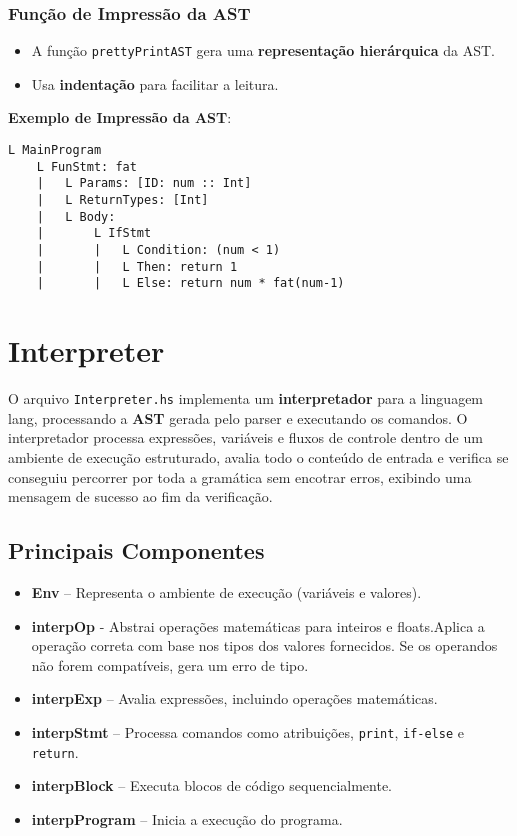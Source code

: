 \documentclass{article}
\begin{document}
\subsubsection{Função de Impressão da AST}
\begin{itemize}
    \item A função \texttt{prettyPrintAST} gera uma \textbf{representação hierárquica} da AST.
    \item Usa \textbf{indentação} para facilitar a leitura.
\end{itemize}

\textbf{Exemplo de Impressão da AST}:
\begin{verbatim}
L MainProgram
    L FunStmt: fat
    |   L Params: [ID: num :: Int]
    |   L ReturnTypes: [Int]
    |   L Body:
    |       L IfStmt
    |       |   L Condition: (num < 1)
    |       |   L Then: return 1
    |       |   L Else: return num * fat(num-1)
\end{verbatim}


\section{Interpreter}

O arquivo \texttt{Interpreter.hs} implementa um \textbf{interpretador} para a linguagem lang, processando a \textbf{AST} gerada pelo parser e executando os comandos. O interpretador processa expressões, variáveis e fluxos de controle dentro de um ambiente de execução estruturado, avalia todo o conteúdo de entrada e verifica se conseguiu percorrer por toda a gramática sem encotrar erros, exibindo uma mensagem de sucesso ao fim da verificação.

\subsection{Principais Componentes}
\begin{itemize}
    \item \textbf{Env} – Representa o ambiente de execução (variáveis e valores).
    \item \textbf{interpOp} - Abstrai operações matemáticas para inteiros e floats.Aplica a operação correta com base nos tipos dos valores fornecidos. Se os operandos não forem compatíveis, gera um erro de tipo.
    \item \textbf{interpExp} – Avalia expressões, incluindo operações matemáticas.
    \item \textbf{interpStmt} – Processa comandos como atribuições, \texttt{print}, \texttt{if-else} e \texttt{return}.
    \item \textbf{interpBlock} – Executa blocos de código sequencialmente.
    \item \textbf{interpProgram} – Inicia a execução do programa.
\end{itemize}
\end{document}
